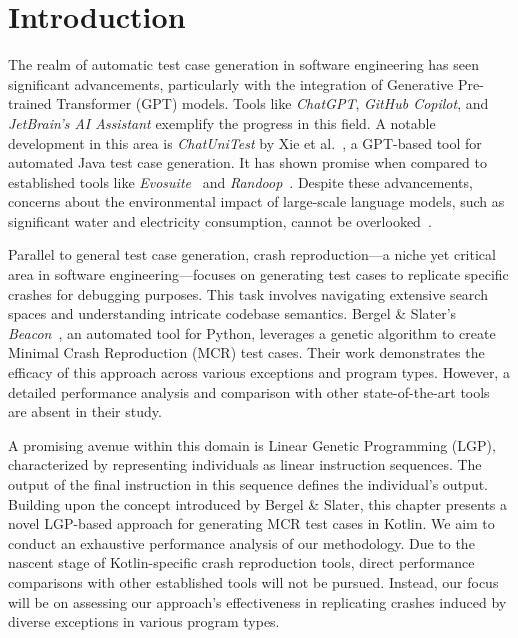 \section{Introduction}
\label{sec:beacon:intro}

    The realm of automatic test case generation in software engineering has seen significant advancements, particularly 
    with the integration of Generative Pre-trained Transformer (GPT) models. Tools like \textit{ChatGPT}, 
    \textit{GitHub Copilot}, and \textit{JetBrain's AI Assistant} exemplify the progress in this field. A notable 
    development in this area is \textit{ChatUniTest} by Xie et al.~\autocite{xieChatUniTestChatGPTbasedAutomated2023}, 
    a GPT-based tool for automated Java test case generation. It has shown promise when compared to established 
    tools like \textit{Evosuite}~\autocite{fraserEvoSuiteAutomaticTest2011} and 
    \textit{Randoop}~\autocite{pachecoRandoopFeedbackdirectedRandom2007}. Despite these advancements, concerns about 
    the environmental impact of large-scale language models, such as significant water and electricity consumption, 
    cannot be overlooked~\autocite{georgeEnvironmentalImpactAI2023, UWResearcherDiscusses}.

    Parallel to general test case generation, crash reproduction—a niche yet critical area in software engineering—focuses 
    on generating test cases to replicate specific crashes for debugging purposes. This task involves navigating extensive 
    search spaces and understanding intricate codebase semantics. Bergel \& Slater's 
    \textit{Beacon}~\autocite{bergelBeaconAutomatedTest2021}, an automated tool for Python, leverages a genetic 
    algorithm to create Minimal Crash Reproduction (MCR) test cases. 
    Their work demonstrates the efficacy of this approach across various exceptions and program types. However, a 
    detailed performance analysis and comparison with other state-of-the-art tools are absent in their study.

    A promising avenue within this domain is Linear Genetic Programming (LGP), characterized by representing individuals 
    as linear instruction sequences. The output of the final instruction in this sequence defines the individual's output. 
    Building upon the concept introduced by Bergel \& Slater, this chapter presents a novel LGP-based approach for 
    generating MCR test cases in Kotlin. We aim to conduct an exhaustive performance analysis of our methodology. 
    Due to the nascent stage of Kotlin-specific crash reproduction tools, direct performance comparisons with other 
    established tools will not be pursued. Instead, our focus will be on assessing our approach's effectiveness in 
    replicating crashes induced by diverse exceptions in various program types.
    